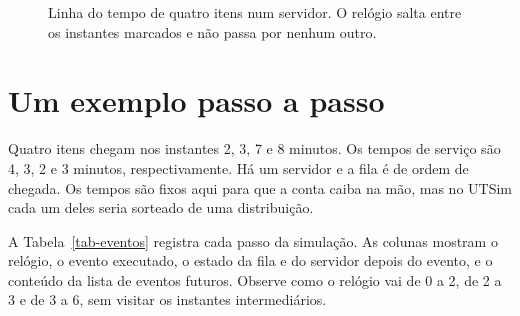 \begin{figure}[ht]
\centering
{}
\caption{Linha do tempo de quatro itens num servidor. O relógio salta entre os instantes marcados e não passa por nenhum outro.}
\label{fig-linha-tempo}
\end{figure}

\section{Um exemplo passo a passo}

Quatro itens chegam nos instantes 2, 3, 7 e 8 minutos. Os tempos de serviço são 4, 3, 2 e 3 minutos, respectivamente. Há um servidor e a fila é de ordem de chegada. Os tempos são fixos aqui para que a conta caiba na mão, mas no UTSim cada um deles seria sorteado de uma distribuição.

A Tabela~\ref{tab-eventos} registra cada passo da simulação. As colunas mostram o relógio, o evento executado, o estado da fila e do servidor depois do evento, e o conteúdo da lista de eventos futuros. Observe como o relógio vai de 0 a 2, de 2 a 3 e de 3 a 6, sem visitar os instantes intermediários.

